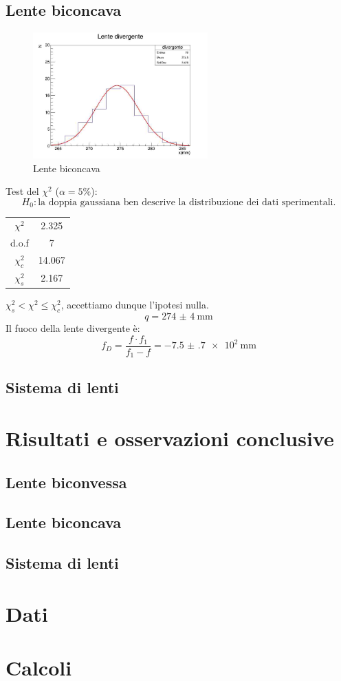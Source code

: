 \documentclass[a4paper]{article}
\begin{document}
    \subsection{Lente biconcava}
    \begin{figure}[H]
    	\centering
    	\includegraphics[width=0.6\textwidth]{histo4.jpg}
    	\caption{Lente biconcava}
    	\label{fig:divergente}
    \end{figure}
    Test del $\chi^2$ ($\alpha=5\%$):
    \[
    H_0: \text{la doppia gaussiana ben descrive la distribuzione dei dati sperimentali.}
    \]
    \begin{table}[H]
    	\centering
    	\begin{tabular}{|c|c|}
    		\hline
    		$\chi^2$ & 2.325 \\
    		d.o.f & 7 \\
    		$\chi^2_c$ & 14.067 \\
    		$\chi^2_s$ & 2.167 \\ \hline
    	\end{tabular}
    	\label{tab:chi-quadro-divergente}
    \end{table}
    $\chi^2_s<\chi^2\leq\chi^2_c$, accettiamo dunque l'ipotesi nulla.
    \[
    q = \SI{274(4)}{\mm}
    \]
    Il fuoco della lente divergente è:
    \[
    f_D=\frac{f\cdot f_1}{f_1-f}=\SI{-7.5(7)e2}{\mm}
    \]
    \subsection{Sistema di lenti}
\section{Risultati e osservazioni conclusive}
    \subsection{Lente biconvessa}
    \subsection{Lente biconcava}
    \subsection{Sistema di lenti}
\begin{appendices}
    \section{Dati}
    \section{Calcoli}
\end{appendices}
\end{document}
